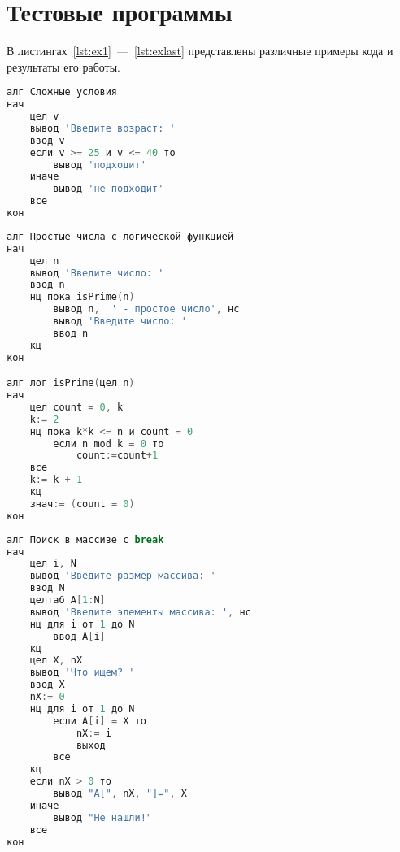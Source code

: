 \section{Тестовые программы}
\label{appendix:b}

В листингах~\ref{lst:ex1}~---~\ref{lst:exlast} представлены различные примеры кода и результаты его работы.

\begin{lstlisting}[language=go, caption={Пример программы с выводом и условными операторами}, label=lst:ex1]
алг Сложные условия
нач
    цел v
    вывод 'Введите возраст: '
    ввод v
    если v >= 25 и v <= 40 то
        вывод 'подходит'
    иначе
        вывод 'не подходит'
    все
кон
\end{lstlisting}

\begin{lstlisting}[language=go, caption={Пример программы с рекурсивным вызовом функции и циклами}, label=lst:ex1]
алг Простые числа с логической функцией
нач
    цел n
    вывод 'Введите число: '
    ввод n
    нц пока isPrime(n)
        вывод n,  ' - простое число', нс
        вывод 'Введите число: '
        ввод n
    кц
кон

алг лог isPrime(цел n)
нач
    цел count = 0, k
    k:= 2
    нц пока k*k <= n и count = 0
        если n mod k = 0 то
            count:=count+1
    все
    k:= k + 1
    кц
    знач:= (count = 0)
кон
\end{lstlisting}

\begin{lstlisting}[language=go, caption={Пример программы с массивом, break и циклом for}, label=lst:exlast]
алг Поиск в массиве с break 
нач
	цел i, N
	вывод 'Введите размер массива: '
	ввод N
	целтаб A[1:N]
	вывод 'Введите элементы массива: ', нс
	нц для i от 1 до N
		ввод A[i]
	кц
	цел X, nX
	вывод 'Что ищем? '
	ввод X
	nX:= 0
	нц для i от 1 до N 
		если A[i] = X то
			nX:= i
			выход
		все
	кц
	если nX > 0 то
		вывод "A[", nX, "]=", X
	иначе 
		вывод "Не нашли!"
	все
кон
\end{lstlisting}

\newpage